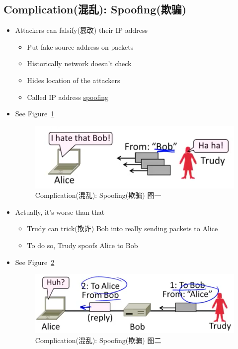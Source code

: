 \documentclass[12pt]{ctexart}   %
\begin{document}
	\subsection{Complication(混乱): Spoofing(欺骗)}
	\begin{itemize}
		\item Attackers can falsify(篡改) their IP address
		\begin{itemize}
			\item Put fake source address on packets
			\item Historically network doesn't check
			\item Hides location of the attackers
			\item Called IP address \underline{spoofing}
		\end{itemize}
		\item See Figure~\ref{fig:10-9-4}
		  
		\begin{figure}[h!] %
		\centering
		\includegraphics[scale=0.7]{images/10-9-4}
		\caption{Complication(混乱): Spoofing(欺骗) 图一}
		\label{fig:10-9-4}
		\end{figure}
		
		\item Actually, it's worse than that
		\begin{itemize}
			\item Trudy can trick(欺诈) Bob into really sending packets to Alice
			\item To do so, Trudy spoofs Alice to Bob
		\end{itemize}
		\item See Figure~\ref{fig:10-9-5}
		  
		\begin{figure}[h!] %
		\centering
		\includegraphics[scale=0.7]{images/10-9-5}
		\caption{Complication(混乱): Spoofing(欺骗) 图二}
		\label{fig:10-9-5}
		\end{figure}
	\end{itemize}
\end{document}
